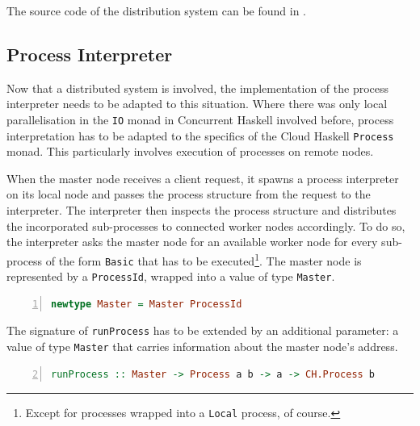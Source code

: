 The source code of the distribution system can be found in .


\subsection{Process Interpreter}
\label{chp:interpreter}
Now that a distributed system is involved, the implementation of the process interpreter needs to be adapted to this situation. Where there was only local parallelisation in the \texttt{IO} monad in \textsf{Concurrent Haskell} involved before, process interpretation has to be adapted to the specifics of the \textsf{Cloud Haskell} \texttt{Process} monad. This particularly involves execution of processes on remote nodes.

When the master node receives a client request, it spawns a process interpreter on its local node and passes the process structure from the request to the interpreter. The interpreter then inspects the process structure and distributes the incorporated sub-processes to connected worker nodes accordingly. To do so, the interpreter asks the master node for an available worker node for every sub-process of the form \texttt{Basic} that has to be executed\footnote{Except for processes wrapped into a \texttt{Local} process, of course.}. The master node is represented by a \texttt{ProcessId}, wrapped into a value of type \texttt{Master}.
\begin{lstlisting}[language=Haskell,caption=Data type for the representation of the address of the master node.,numbers=left,frame=bt]
newtype Master = Master ProcessId
\end{lstlisting}

The signature of \texttt{runProcess} has to be extended by an additional parameter: a value of type \texttt{Master} that carries information about the master node's address.
\begin{lstlisting}[language=Haskell,caption=Signature of the process interpreter implemented using \textsf{Cloud Haskell}.,label=lst:interpreter_signature,numbers=left,frame=bt,firstnumber=2]
runProcess :: Master -> Process a b -> a -> CH.Process b
\end{lstlisting}

